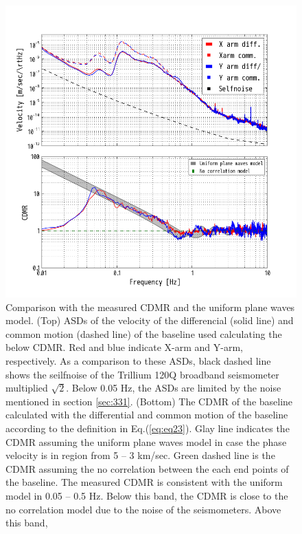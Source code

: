 \begin{figure}[p]
    \begin{center}   
      \includegraphics[width=13.0cm]{./img_chap3/img319.png}
      \caption{Comparison with the measured CDMR and the uniform plane waves model. (Top) ASDs of the velocity of the differencial (solid line) and common motion (dashed line) of the baseline used calculating the below CDMR. Red and blue indicate X-arm and Y-arm, respectively. As a comparison to these ASDs, black dashed line shows the seilfnoise of the Trillium 120Q broadband seismometer multiplied $\sqrt{2}$. Below 0.05 Hz, the ASDs are limited by the noise mentioned in section \cref{sec:331}. (Bottom) The CDMR of the baseline calculated with the differential and common motion of the baseline according to  the definition in Eq.(\ref{eq:eq23}). Glay line indicates the CDMR assuming the uniform plane waves model in case the phase velocity is in region from 5 -- 3 km/sec. Green dashed line is the CDMR assuming the no correlation between the each end points of the baseline. The measured CDMR is consistent with the uniform model in 0.05 -- 0.5 Hz. Below this band, the CDMR is close to the no correlation model due to the noise of the seismometers. Above this band, }\label{img:img319}
    \end{center}
\end{figure}


